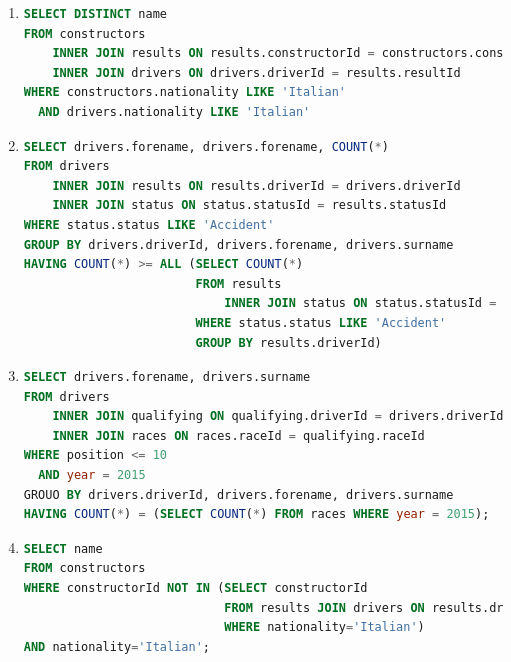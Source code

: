 \documentclass{db-practice}
\begin{document}
\begin{enumerate}
\item
\begin{lstlisting}[language=SQL]
SELECT DISTINCT name
FROM constructors
    INNER JOIN results ON results.constructorId = constructors.constructorId
    INNER JOIN drivers ON drivers.driverId = results.resultId
WHERE constructors.nationality LIKE 'Italian'
  AND drivers.nationality LIKE 'Italian'
\end{lstlisting}
       
\item
\begin{lstlisting}[language=SQL]
SELECT drivers.forename, drivers.forename, COUNT(*)
FROM drivers
    INNER JOIN results ON results.driverId = drivers.driverId
    INNER JOIN status ON status.statusId = results.statusId
WHERE status.status LIKE 'Accident'
GROUP BY drivers.driverId, drivers.forename, drivers.surname
HAVING COUNT(*) >= ALL (SELECT COUNT(*)
                        FROM results
                            INNER JOIN status ON status.statusId = results.statusId
                        WHERE status.status LIKE 'Accident'
                        GROUP BY results.driverId) 
\end{lstlisting}
      
\item
\begin{lstlisting}[language=SQL]
SELECT drivers.forename, drivers.surname
FROM drivers 
    INNER JOIN qualifying ON qualifying.driverId = drivers.driverId
    INNER JOIN races ON races.raceId = qualifying.raceId
WHERE position <= 10
  AND year = 2015
GROUO BY drivers.driverId, drivers.forename, drivers.surname
HAVING COUNT(*) = (SELECT COUNT(*) FROM races WHERE year = 2015);
\end{lstlisting}

\item
\begin{lstlisting}[language=SQL]
SELECT name
FROM constructors
WHERE constructorId NOT IN (SELECT constructorId
                            FROM results JOIN drivers ON results.driverId=drivers.driverId
                            WHERE nationality='Italian')
AND nationality='Italian';
\end{lstlisting}


\end{enumerate}
\end{document}
